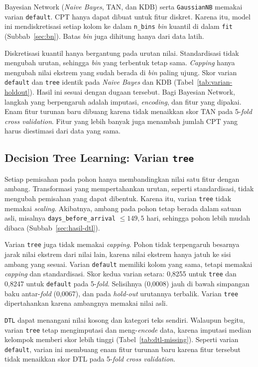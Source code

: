 Bayesian Network (\textit{Naive Bayes}, TAN, dan KDB) serta \texttt{GaussianNB}
memakai varian \texttt{default}. CPT hanya dapat dibuat untuk fitur diskret.
Karena itu, model ini mendiskretisasi setiap kolom ke dalam \texttt{n\_bins}
\textit{bin} kuantil di dalam \texttt{fit} (Subbab~\ref{sec:bn}). Batas
\textit{bin} juga dihitung hanya dari data latih.

Diskretisasi kuantil hanya bergantung pada urutan nilai. Standardisasi tidak
mengubah urutan, sehingga \textit{bin} yang terbentuk tetap sama. \textit{Capping}
hanya mengubah nilai ekstrem yang sudah berada di \textit{bin} paling ujung. Skor
varian \texttt{default} dan \texttt{tree} identik pada \textit{Naive Bayes} dan
KDB (Tabel~\ref{tab:varian-holdout}). Hasil ini sesuai dengan dugaan tersebut.
Bagi Bayesian Network, langkah yang berpengaruh adalah imputasi, \textit{encoding},
dan fitur yang dipakai. Enam fitur turunan baru dibuang karena tidak menaikkan
skor TAN pada 5-\textit{fold cross validation}. Fitur yang lebih banyak juga
menambah jumlah CPT yang harus diestimasi dari data yang sama.

\subsection{Decision Tree Learning: Varian \texttt{tree}}

Setiap pemisahan pada pohon hanya membandingkan nilai satu fitur dengan ambang.
Transformasi yang mempertahankan urutan, seperti standardisasi, tidak mengubah
pemisahan yang dapat dibentuk. Karena itu, varian \texttt{tree} tidak memakai
\textit{scaling}. Akibatnya, ambang pada pohon tetap berada dalam satuan asli,
misalnya \texttt{days\_before\_arrival} $\le 149{,}5$ hari, sehingga pohon lebih
mudah dibaca (Subbab~\ref{sec:hasil-dtl}).

Varian \texttt{tree} juga tidak memakai \textit{capping}. Pohon tidak terpengaruh
besarnya jarak nilai ekstrem dari nilai lain, karena nilai ekstrem hanya jatuh
ke sisi ambang yang sesuai. Varian \texttt{default} memiliki kolom yang sama,
tetapi memakai \textit{capping} dan standardisasi. Skor kedua varian setara:
0,8255 untuk \texttt{tree} dan 0,8247 untuk \texttt{default} pada 5-\textit{fold}.
Selisihnya (0,0008) jauh di bawah simpangan baku antar-\textit{fold} (0,0067), dan
pada \textit{hold-out} urutannya terbalik. Varian \texttt{tree} dipertahankan karena ambangnya memakai
nilai asli.

\texttt{DTL} dapat menangani nilai kosong dan kategori teks sendiri. Walaupun
begitu, varian \texttt{tree} tetap mengimputasi dan meng-\textit{encode} data,
karena imputasi median kelompok memberi skor lebih tinggi
(Tabel~\ref{tab:dtl-missing}). Seperti varian \texttt{default}, varian ini
membuang enam fitur turunan baru karena fitur tersebut tidak menaikkan skor DTL
pada 5-\textit{fold cross validation}.

